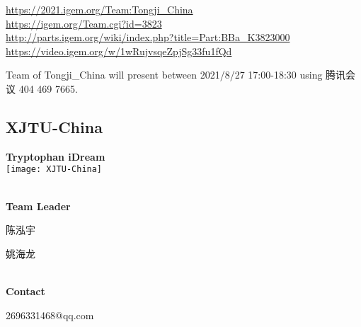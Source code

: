 \url{https://2021.igem.org/Team:Tongji\_China }\\
\url{https://igem.org/Team.cgi?id=3823 }\\
\url{http://parts.igem.org/wiki/index.php?title=Part:BBa_K3823000 }\\
\url{https://video.igem.org/w/1wRujvsqeZpjSg33fu1fQd }\\

\vfill{}









Team of Tongji\_China will present between   2021/8/27 17:00-18:30      using 腾讯会议 404 469 7665.
\newpage


\subsection{\textcolor{Blu}{ XJTU-China } }
\vspace{5mm}
\begin{center}
\large{
  \textbf{ Tryptophan iDream }\\
  \texttt{[image: XJTU-China]}
}
\end{center}
\textbf{\\Team Leader}

  陈泓宇

  姚海龙


\textbf{\\Contact}

  2696331468@qq.com


